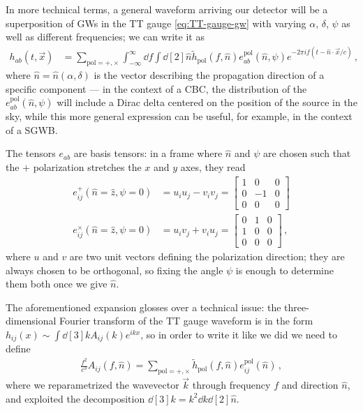 \documentclass[main.tex]{subfiles}
\begin{document}
In more technical terms, a general waveform arriving our detector will be a superposition of \acsp{GW} in the TT gauge \eqref{eq:TT-gauge-gw} with varying \(\alpha \), \(\delta \), \(\psi \) as well as different frequencies; we can write it as \cite[eq.\ 1.58]{maggioreGravitationalWavesVolume2007}
%
\begin{align} \label{eq:generic-gw}
h_{ab} (t, \vec{x}) &= \sum _{\text{pol} = +, \times }
\int_{- \infty  }^{\infty } \dd{f} \int \dd[2]{\hat{n}} \widetilde{h}_{\text{pol}} (f, \hat{n}) e^{\text{pol}}_{ab}(\hat{n}, \psi ) e^{-2 \pi i f (t - \hat{n}\cdot \vec{x} / c )} 
\,,
\end{align}
%
where \(\hat{n} = \hat{n} (\alpha , \delta )\) is the vector describing the propagation direction of a specific component --- in the context of a \ac{CBC}, the distribution of the \(e^{\text{pol}}_{ab}(\hat{n}, \psi )\) will include a Dirac delta centered on the position of the source in the sky, while this more general expression can be useful, for example, in the context of a \ac{SGWB}. 

The tensors \(e_{ab}\) are basis tensors: in a frame where \(\hat{n}\) and \(\psi \) are chosen such that the \(+\) polarization stretches the \(x\) and \(y\) axes, they read 
%
\begin{subequations}
\begin{align}
e_{ij}^{+} (\hat{n}=\hat{z}, \psi =0) &= u_i u_j - v_i v_j = \left[\begin{array}{ccc}
1 & 0 & 0 \\ 
0 & -1 & 0 \\ 
0 & 0 & 0
\end{array}\right]  \\
e_{ij}^{ \times } (\hat{n}=\hat{z}, \psi = 0) &= u_i v_j + v_i u_j = \left[\begin{array}{ccc}
0 & 1 & 0 \\ 
1 & 0 & 0 \\ 
0 & 0 & 0
\end{array}\right]
\,,
\end{align}
\end{subequations}
%
where \(u\) and \(v\) are two unit vectors defining the polarization direction; they are always chosen to be orthogonal, so fixing the angle \(\psi \) is enough to determine them both once we give \(\hat{n}\). 

The aforementioned expansion glosses over a technical issue: the three-dimensional Fourier transform of the \ac{TT} gauge waveform is in the form \(h_{ij}(x) \sim \int \dd[3]{k} A_{ij}(k) e^{ikx}\), so in order to write it like we did we need to define 
%
\begin{align}
\frac{f^2}{c^3} A_{ij} (f, \hat{n}) = \sum _{\text{pol}= +, \times }
\widetilde{h}_{\text{pol}} (f, \hat{n}) e^{\text{pol}}_{ij}(\hat{n})
\,,
\end{align}
%
where we reparametrized the wavevector \(\vec{k}\) through frequency \(f\) and direction \(\hat{n}\), and exploited the decomposition \(\dd[3]{k} = k^2 \dd{k} \dd[2]{\hat{n}}\).
\end{document}
